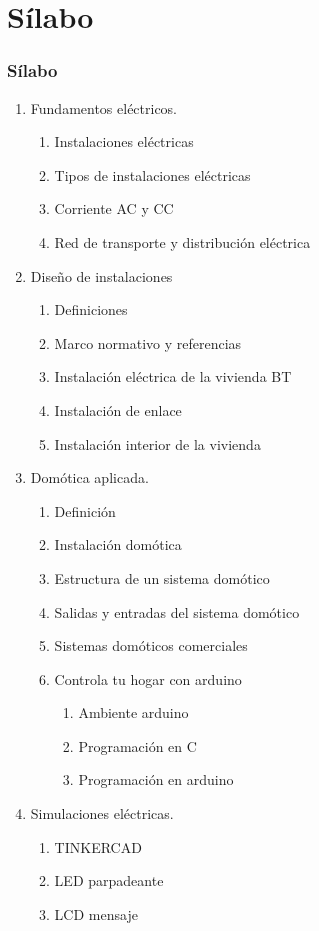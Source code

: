 \documentclass[xcolor=dvipsnames,envcountsect]{beamer}
\begin{document}
\section{Sílabo}
\begin{frame}
	\frametitle{Sílabo}
		\justifying
		\begin{enumerate}
		\item Fundamentos eléctricos.
			\begin{enumerate}
			\item Instalaciones eléctricas
			\item Tipos de instalaciones eléctricas
			\item Corriente AC y CC
			\item Red de transporte y distribución eléctrica
			\end{enumerate}
		\item Diseño de instalaciones
			\begin{enumerate}
			\item Definiciones
			\item Marco normativo y referencias
			\item Instalación eléctrica de la vivienda BT
			\item Instalación de enlace
			\item Instalación interior de la vivienda
			\end{enumerate}
		\item Domótica aplicada.
			\begin{enumerate}
			\item Definición
			\item Instalación domótica
			\item Estructura de un sistema domótico
			\item Salidas y entradas del sistema domótico
			\item Sistemas domóticos comerciales
			\item Controla tu hogar con arduino
			\begin{enumerate}
				\item Ambiente arduino
				\item Programación en C
				\item Programación en arduino 
			\end{enumerate}		
			\end{enumerate}
		\item Simulaciones eléctricas.
			\begin{enumerate}
			\item TINKERCAD
			\item LED parpadeante
			\item LCD mensaje
			\end{enumerate}
		\end{enumerate}
\end{frame}
\end{document}
